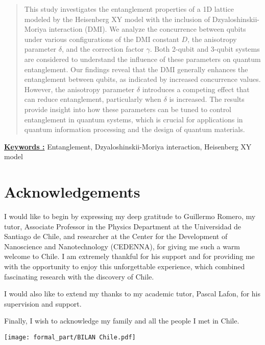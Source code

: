 \pagestyle{romanstyle}
\begin{abstract}
	This study investigates the entanglement properties of a 1D lattice modeled by the Heisenberg XY model with the inclusion of Dzyaloshinskii-Moriya interaction (DMI). We analyze the concurrence between qubits under various configurations of the DMI constant \(D\), the anisotropy parameter \(\delta\), and the correction factor \(\gamma\). Both 2-qubit and 3-qubit systems are considered to understand the influence of these parameters on quantum entanglement. Our findings reveal that the DMI generally enhances the entanglement between qubits, as indicated by increased concurrence values. However, the anisotropy parameter \(\delta\) introduces a competing effect that can reduce entanglement, particularly when \(\delta\) is increased. The results provide insight into how these parameters can be tuned to control entanglement in quantum systems, which is crucial for applications in quantum information processing and the design of quantum materials.


\end{abstract}

\underline{\textbf{Keywords :}} Entanglement, Dzyaloshinskii-Moriya interaction, Heisenberg XY model

\newpage
\section*{Acknowledgements}
I would like to begin by expressing my deep gratitude to Guillermo Romero, my tutor, Associate Professor in the Physics Department at the Universidad de Santiago de Chile, and researcher at the Center for the Development of Nanoscience and Nanotechnology (CEDENNA), for giving me such a warm welcome to Chile. I am extremely thankful for his support and for providing me with the opportunity to enjoy this unforgettable experience, which combined fascinating research with the discovery of Chile.

I would also like to extend my thanks to my academic tutor, Pascal Lafon, for his supervision and support.

Finally, I wish to acknowledge my family and all the people I met in Chile.
\begin{center}
	\texttt{[image: formal\_part/BILAN Chile.pdf]}
\end{center}

\newpage



\newpage

		
\startcontents[sections]

\newpage

		\listoffigures




